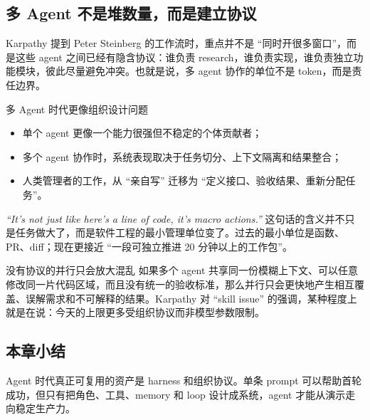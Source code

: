 \subsection{多 Agent 不是堆数量，而是建立协议}
Karpathy 提到 Peter Steinberg 的工作流时，重点并不是 ``同时开很多窗口''，而是这些 agent 之间已经有隐含协议：谁负责 research，谁负责实现，谁负责独立功能模块，彼此尽量避免冲突。也就是说，多 agent 协作的单位不是 token，而是责任边界。

\begin{knowledgebox}{多 Agent 时代更像组织设计问题}
\begin{itemize}
    \item 单个 agent 更像一个能力很强但不稳定的个体贡献者；
    \item 多个 agent 协作时，系统表现取决于任务切分、上下文隔离和结果整合；
    \item 人类管理者的工作，从 ``亲自写'' 迁移为 ``定义接口、验收结果、重新分配任务''。
\end{itemize}
\end{knowledgebox}

\textit{``It's not just like here's a line of code, it's macro actions.''} 这句话的含义并不只是任务做大了，而是软件工程的最小管理单位变了。过去的最小单位是函数、PR、diff；现在更接近 ``一段可独立推进 20 分钟以上的工作包''。

\begin{warningbox}{没有协议的并行只会放大混乱}
如果多个 agent 共享同一份模糊上下文、可以任意修改同一片代码区域，而且没有统一的验收标准，那么并行只会更快地产生相互覆盖、误解需求和不可解释的结果。Karpathy 对 ``skill issue'' 的强调，某种程度上就是在说：今天的上限更多受组织协议而非模型参数限制。
\end{warningbox}

\subsection{本章小结}
Agent 时代真正可复用的资产是 harness 和组织协议。单条 prompt 可以帮助首轮成功，但只有把角色、工具、memory 和 loop 设计成系统，agent 才能从演示走向稳定生产力。


